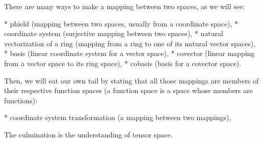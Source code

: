 There are many ways to make a mapping between two spaces,
as we will see:

* phield (mapping between two spaces, usually from a coordinate space),
* coordinate system (surjective mapping between two spaces),
* natural vectorization of a ring (mapping from a ring to one of its natural vector spaces),
* basis (linear coordinate system for a vector space),
* covector (linear mapping from a vector space to its ring space),
* cobasis (basis for a covector space).

Then, we will eat our own tail by stating that all those mappings are members of their respective function spaces
(a function space is a space whose members are functions):

* coordinate system transformation (a mapping between two mappings),

The culmination is the understanding of tensor space.
